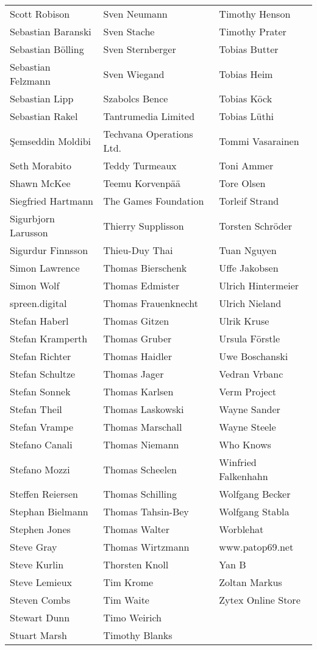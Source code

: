 \begin{tabular}{p{4.5cm}p{4.5cm}p{4.5cm}}
Scott Robison & Sven Neumann & Timothy Henson \\
Sebastian Baranski & Sven Stache & Timothy Prater \\
Sebastian Bölling & Sven Sternberger & Tobias Butter \\
Sebastian Felzmann & Sven Wiegand & Tobias Heim \\
Sebastian Lipp & Szabolcs Bence & Tobias Köck \\
Sebastian Rakel & Tantrumedia Limited & Tobias Lüthi \\
Şemseddin Moldibi & Techvana Operations Ltd. & Tommi Vasarainen \\
Seth Morabito & Teddy Turmeaux & Toni Ammer \\
Shawn McKee & Teemu Korvenpää & Tore Olsen \\
Siegfried Hartmann & The Games Foundation & Torleif Strand \\
Sigurbjorn Larusson & Thierry Supplisson & Torsten Schröder \\
Sigurdur Finnsson & Thieu-Duy Thai & Tuan Nguyen \\
Simon Lawrence & Thomas Bierschenk & Uffe Jakobsen \\
Simon Wolf & Thomas Edmister & Ulrich Hintermeier \\
spreen.digital & Thomas Frauenknecht & Ulrich Nieland \\
Stefan Haberl & Thomas Gitzen & Ulrik Kruse \\
Stefan Kramperth & Thomas Gruber & Ursula Förstle \\
Stefan Richter & Thomas Haidler & Uwe Boschanski \\
Stefan Schultze & Thomas Jager & Vedran Vrbanc \\
Stefan Sonnek & Thomas Karlsen & Verm Project \\
Stefan Theil & Thomas Laskowski & Wayne Sander \\
Stefan Vrampe & Thomas Marschall & Wayne Steele \\
Stefano Canali & Thomas Niemann & Who Knows \\
Stefano Mozzi & Thomas Scheelen & Winfried Falkenhahn \\
Steffen Reiersen & Thomas Schilling & Wolfgang Becker \\
Stephan Bielmann & Thomas Tahsin-Bey & Wolfgang Stabla \\
Stephen Jones & Thomas Walter & Worblehat \\
Steve Gray & Thomas Wirtzmann & www.patop69.net \\
Steve Kurlin & Thorsten Knoll & Yan B \\
Steve Lemieux & Tim Krome & Zoltan Markus \\
Steven Combs & Tim Waite & Zytex Online Store \\
Stewart Dunn & Timo Weirich &  \\
Stuart Marsh & Timothy Blanks &  \\
\end{tabular}
